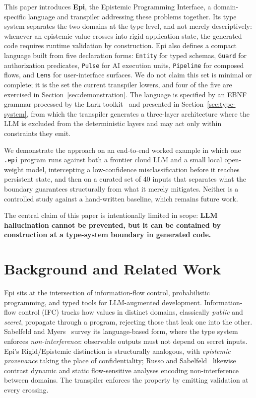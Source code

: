 \documentclass[sigconf]{acmart}
\begin{document}
This paper introduces \textbf{Epi}, the Epistemic Programming Interface, a domain-specific language and transpiler addressing these problems together. Its type system separates the two domains at the type level, and not merely descriptively: whenever an epistemic value crosses into rigid application state, the generated code requires runtime validation by construction.
Epi also defines a compact language built from five declaration forms: \texttt{Entity} for typed schemas, \texttt{Guard} for authorization predicates, \texttt{Pulse} for AI execution units, \texttt{Pipeline} for composed flows, and \texttt{Lens} for user-interface surfaces. We do not claim this set is minimal or complete; it is the set the current transpiler lowers, and four of the five are exercised in Section~\ref{sec:demonstration}. The language is specified by an EBNF grammar processed by the Lark toolkit~\cite{lark} and presented in Section~\ref{sec:type-system}, from which the transpiler generates a three-layer architecture where the LLM is excluded from the deterministic layers and may act only within constraints they emit.

We demonstrate the approach on an end-to-end worked example in which one \texttt{.epi} program runs against both a frontier cloud LLM and a small local open-weight model, intercepting a low-confidence misclassification before it reaches persistent state, and then on a curated set of 40 inputs that separates what the boundary guarantees structurally from what it merely mitigates. Neither is a controlled study against a hand-written baseline, which remains future work.

The central claim of this paper is intentionally limited in scope: \textbf{LLM hallucination cannot be prevented, but it can be contained by construction at a type-system boundary in generated code.}

\section{Background and Related Work}
\label{sec:related}

Epi sits at the intersection of information-flow control, probabilistic programming, and typed tools for LLM-augmented development. Information-flow control (IFC) tracks how values in distinct domains, classically \emph{public} and \emph{secret}, propagate through a program, rejecting those that leak one into the other. Sabelfeld and Myers~\cite{sabelfeld2003} survey its language-based form, where the type system enforces \emph{non-interference}: observable outputs must not depend on secret inputs. Epi's Rigid/Epistemic distinction is structurally analogous, with \emph{epistemic provenance} taking the place of confidentiality; Russo and Sabelfeld~\cite{russo2010} likewise contrast dynamic and static flow-sensitive analyses encoding non-interference between domains. The transpiler enforces the property by emitting validation at every crossing.
\end{document}
